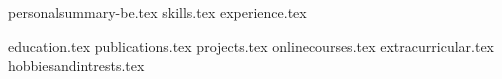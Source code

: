 \documentclass[12pt, a4paper]{awesome-cv}
\newcommand*{\sectiondir}{resume/}
\begin{document}
\makecvheader

\setcounter{ats}{0}

{personalsummary-be.tex}
{skills.tex}
{experience.tex}
\pagebreak

{education.tex}
{publications.tex}
{projects.tex}
{onlinecourses.tex}
{extracurricular.tex}
{hobbiesandintrests.tex}
\end{document}
